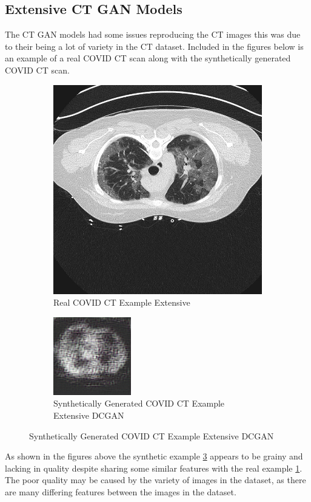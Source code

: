 \subsection{Extensive CT GAN Models}
The CT GAN models had some issues reproducing the CT images this was due to their being a lot of variety in the CT dataset.  Included in the figures below is an example of a real COVID CT scan along with the synthetically generated COVID CT scan.
 \begin{figure}[H]
    \centering
    \begin{subfigure}{.4\textwidth}
    \centering
      \includegraphics[width=.4\linewidth,keepaspectratio]{Images/COVIDCTScanExampleExtensive.png}
      \caption{Real COVID CT Example Extensive}
      \label{fig:Real COVID CT Example Extensive}
    \end{subfigure}\hfill%
    \begin{subfigure}{.4\textwidth}
    \centering
      \includegraphics[width=.4\linewidth,keepaspectratio]{Images/ExampleOfSyntheticallyGeneratedCOVIDCTScanExtensiveDCGAN.png}
      \caption{Synthetically Generated COVID CT Example Extensive DCGAN}
      \label{fig:Synthetically Generated COVID CT Example Extensive DCGAN}
    \end{subfigure}\hfill%
\end{figure}
As shown in the figures above the synthetic example \ref{fig:Synthetically Generated COVID CT Example Extensive DCGAN} appears to be grainy and lacking in quality despite sharing some similar features with the real example \ref{fig:Real COVID CT Example Extensive}.  The poor quality may be caused by the variety of images in the dataset, as there are many differing features between the images in the dataset. 
